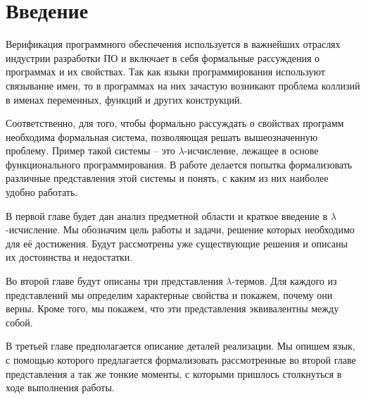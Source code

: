 \section*{Введение}

Верификация программного обеспечения используется в важнейших отраслях индустрии разработки ПО и включает в себя формальные рассуждения о программах и их свойствах. Так как языки программирования используют связывание имен, то в программах на них зачастую возникают проблема коллизий в именах переменных, функций и других конструкций.

Соответственно, для того, чтобы формально рассуждать о свойствах программ необходима формальная система, позволяющая решать вышеозначенную проблему. Пример такой системы -- это $\lambda$-исчисление, лежащее в основе функционального программирования. В работе делается попытка формализовать различные представления этой системы и понять, с каким из них наиболее удобно работать.

В первой главе будет дан анализ предметной области и краткое введение в $\lambda$-исчисление. Мы обозначим цель работы и задачи, решение которых необходимо для её достижения. Будут рассмотрены уже существующие решения и описаны их достоинства и недостатки.

Во второй главе будут описаны три представления $\lambda$-термов. Для каждого из представлений мы определим характерные свойства и покажем, почему они верны. Кроме того, мы покажем, что эти представления эквивалентны между собой.

В третьей главе предполагается описание деталей реализации. Мы опишем язык, с помощью которого предлагается формализовать рассмотренные во второй главе представления а так же тонкие моменты, с которыми пришлось столкнуться в ходе выполнения работы.

